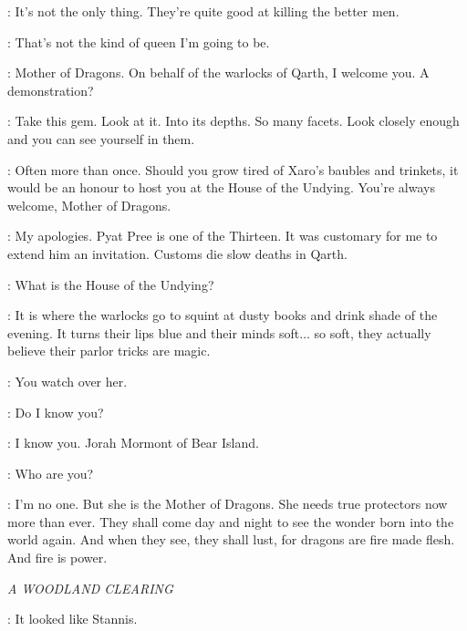 \JORAH: It's not the only thing. They're quite good at killing the better men. 

\DAENERYS: That's not the kind of queen I'm going to be. 


\PYAT: Mother of Dragons. On behalf of the warlocks of Qarth, I welcome you. A demonstration? 


\PYAT: Take this gem. Look at it. Into its depths. So many facets. Look closely enough and you can see yourself in them. 


\PYAT: Often more than once. Should you grow tired of Xaro's baubles and trinkets, it would be an honour to host you at the House of the Undying. You're always welcome, Mother of Dragons. 


\XARO: My apologies. Pyat Pree is one of the Thirteen. It was customary for me to extend him an invitation. Customs die slow deaths in Qarth. 

\DAENERYS: What is the House of the Undying? 

\XARO: It is where the warlocks go to squint at dusty books and drink shade of the evening. It turns their lips blue and their minds soft$\ldots$ so soft, they actually believe their parlor tricks are magic. 


\QUAITHE: You watch over her. 

\JORAH: Do I know you? 

\QUAITHE: I know you. Jorah Mormont of Bear Island. 

\JORAH: Who are you? 

\QUAITHE: I'm no one. But she is the Mother of Dragons. She needs true protectors now more than ever. They shall come day and night to see the wonder born into the world again. And when they see, they shall lust, for dragons are fire made flesh. And fire is power. 



\scene

\textit{A WOODLAND CLEARING} 


\BRIENNE: It looked like Stannis. 

